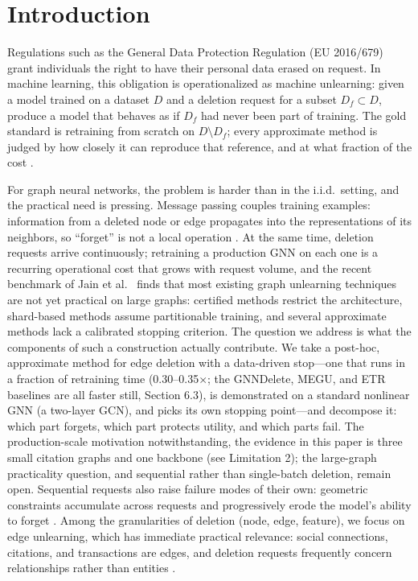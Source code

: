 \documentclass[pdflatex,sn-basic,Numbered]{sn-jnl}
\begin{document}
\section{Introduction}
Regulations such as the General Data Protection Regulation (EU 2016/679) grant individuals the right to have their personal data erased on request. In machine learning, this obligation is operationalized as machine unlearning: given a model trained on a dataset $D$ and a deletion request for a subset $D_f \subset D$, produce a model that behaves as if $D_f$ had never been part of training. The gold standard is retraining from scratch on $D \setminus D_f$; every approximate method is judged by how closely it can reproduce that reference, and at what fraction of the cost \cite{bourtoule2021,ginart2019}.

For graph neural networks, the problem is harder than in the i.i.d.\ setting, and the practical need is pressing. Message passing couples training examples: information from a deleted node or edge propagates into the representations of its neighbors, so ``forget'' is not a local operation \cite{grapheraser2022,said2023}. At the same time, deletion requests arrive continuously; retraining a production GNN on each one is a recurring operational cost that grows with request volume, and the recent benchmark of Jain et al.\ \cite{jain2026} finds that most existing graph unlearning techniques are not yet practical on large graphs: certified methods restrict the architecture, shard-based methods assume partitionable training, and several approximate methods lack a calibrated stopping criterion. The question we address is what the components of such a construction actually contribute. We take a post-hoc, approximate method for edge deletion with a data-driven stop---one that runs in a fraction of retraining time (0.30--0.35$\times$; the GNNDelete, MEGU, and ETR baselines are all faster still, Section 6.3), is demonstrated on a standard nonlinear GNN (a two-layer GCN), and picks its own stopping point---and decompose it: which part forgets, which part protects utility, and which parts fail. The production-scale motivation notwithstanding, the evidence in this paper is three small citation graphs and one backbone (see Limitation 2); the large-graph practicality question, and sequential rather than single-batch deletion, remain open. Sequential requests also raise failure modes of their own: geometric constraints accumulate across requests and progressively erode the model's ability to forget \cite{plasticity2026}. Among the granularities of deletion (node, edge, feature), we focus on edge unlearning, which has immediate practical relevance: social connections, citations, and transactions are edges, and deletion requests frequently concern relationships rather than entities \cite{utu2024}.
\end{document}

